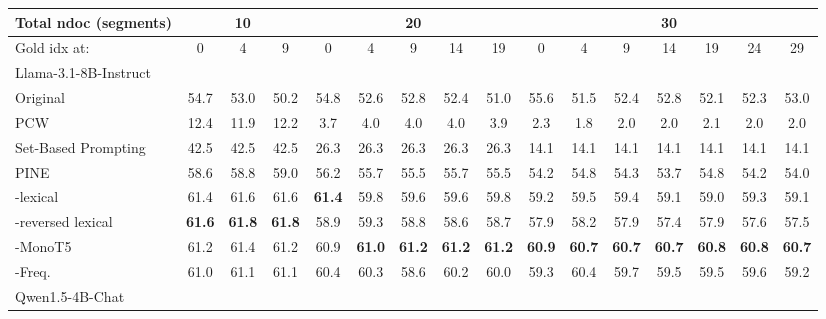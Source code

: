 \begin{table*}[!t]
\centering
\resizebox{0.85\linewidth}{!}
{
\begin{tabular}{@{}lccccccccccccccc@{}}
\toprule
\multicolumn{1}{l|}{Total ndoc (segments)} & \multicolumn{3}{c|}{10} & \multicolumn{5}{c|}{20} & \multicolumn{7}{c}{30} \\ \midrule
\multicolumn{1}{l|}{Gold idx at:} & 0 & 4 & \multicolumn{1}{c|}{9} & 0 & 4 & 9 & 14 & \multicolumn{1}{c|}{19} & 0 & 4 & 9 & 14 & 19 & 24 & 29 \\ \midrule
\multicolumn{16}{l}{Llama-3.1-8B-Instruct} \\ \midrule
\multicolumn{1}{l|}{Original} & 54.7 & 53.0 & \multicolumn{1}{c|}{50.2} & 54.8 & 52.6 & 52.8 & 52.4 & \multicolumn{1}{c|}{51.0} & 55.6 & 51.5 & 52.4 & 52.8 & 52.1 & 52.3 & 53.0 \\
\multicolumn{1}{l|}{PCW} & 12.4 & 11.9 & \multicolumn{1}{c|}{12.2} & 3.7 & 4.0 & 4.0 & 4.0 & \multicolumn{1}{c|}{3.9} & 2.3 & 1.8 & 2.0 & 2.0 & 2.1 & 2.0 & 2.0 \\
\multicolumn{1}{l|}{Set-Based Prompting} & 42.5 & 42.5 & \multicolumn{1}{c|}{42.5} & 26.3 & 26.3 & 26.3 & 26.3 & \multicolumn{1}{c|}{26.3} & 14.1 & 14.1 & 14.1 & 14.1 & 14.1 & 14.1 & 14.1 \\
\multicolumn{1}{l|}{PINE} & 58.6 & 58.8 & \multicolumn{1}{c|}{59.0} & 56.2 & 55.7 & 55.5 & 55.7 & \multicolumn{1}{c|}{55.5} & 54.2 & 54.8 & 54.3 & 53.7 & 54.8 & 54.2 & 54.0 \\
\multicolumn{1}{l|}{\ours{}-lexical} & 61.4 & 61.6 & \multicolumn{1}{c|}{61.6} & \textbf{61.4} & 59.8 & 59.6 & 59.6 & \multicolumn{1}{c|}{59.8} & 59.2 & 59.5 & 59.4 & 59.1 & 59.0 & 59.3 & 59.1 \\
\multicolumn{1}{l|}{\ours{}-reversed lexical} & \textbf{61.6} & \textbf{61.8} & \multicolumn{1}{c|}{\textbf{61.8}} & 58.9 & 59.3 & 58.8 & 58.6 & \multicolumn{1}{c|}{58.7} & 57.9 & 58.2 & 57.9 & 57.4 & 57.9 & 57.6 & 57.5 \\
\multicolumn{1}{l|}{\ours{}-MonoT5} & 61.2 & 61.4 & \multicolumn{1}{c|}{61.2} & 60.9 & \textbf{61.0} & \textbf{61.2} & \textbf{61.2} & \multicolumn{1}{c|}{\textbf{61.2}} & \textbf{60.9} & \textbf{60.7} & \textbf{60.7} & \textbf{60.7} & \textbf{60.8} & \textbf{60.8} & \textbf{60.7} \\
\multicolumn{1}{l|}{\ours{}-Freq.} & 61.0 & 61.1 & \multicolumn{1}{c|}{61.1} & 60.4 & 60.3 & 58.6 & 60.2 & \multicolumn{1}{c|}{60.0} & 59.3 & 60.4 & 59.7 & 59.5 & 59.5 & 59.6 & 59.2 \\ \midrule
\multicolumn{16}{l}{Qwen1.5-4B-Chat} \\ \midrule

\end{tabular}}
\end{table*}
